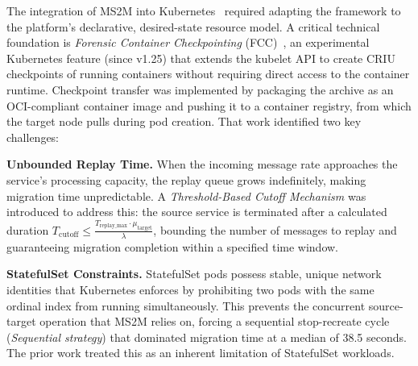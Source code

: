 \documentclass[conference]{IEEEtran}
\begin{document}
%
%
The integration of MS2M into Kubernetes~\cite{dinhtuan2025k8s} required
adapting the framework to the platform's declarative, desired-state resource
model. A critical technical foundation is \textit{Forensic Container
Checkpointing} (FCC)~\cite{k8sfcc}, an experimental Kubernetes feature (since
v1.25) that extends the kubelet API to create CRIU checkpoints of running
containers without requiring direct access to the container runtime. Checkpoint
transfer was implemented by packaging the archive as an OCI-compliant container
image and pushing it to a container registry, from which the target node pulls
during pod creation. That work identified two key challenges:

\textbf{Unbounded Replay Time.} When the incoming message rate approaches the
service's processing capacity, the replay queue grows indefinitely, making
migration time unpredictable. A \textit{Threshold-Based Cutoff Mechanism} was
introduced to address this: the source service is terminated after a calculated
duration $T_{\text{cutoff}} \leq \frac{T_{\text{replay\_max}} \cdot
\mu_{\text{target}}}{\lambda}$, bounding the number of messages to replay and
guaranteeing migration completion within a specified time window.

\textbf{StatefulSet Constraints.} StatefulSet pods possess stable, unique network
identities that Kubernetes enforces by prohibiting two pods with the same ordinal
index from running simultaneously. This prevents the concurrent source-target
operation that MS2M relies on, forcing a sequential stop-recreate cycle
(\textit{Sequential strategy}) that dominated migration time at a median of
38.5 seconds. The prior work treated this as an inherent limitation of StatefulSet
workloads.
\end{document}
